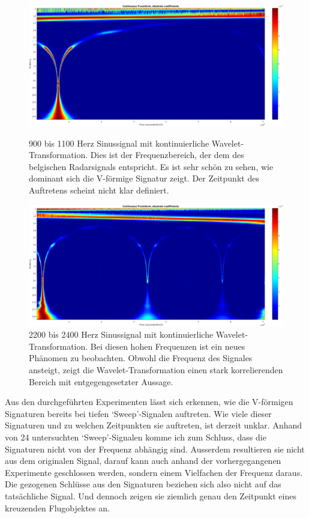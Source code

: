 \begin{refsection}
\begin{figure}
	\centering
	\includegraphics[width=1.0\linewidth]{papers/meteor/images/anomalie/sweep/cwt_0900to1100hz-clipped.png}
	\caption{900 bis 1100 Herz Sinussignal mit kontinuierliche Wavelet-Transformation.
	Dies ist der Frequenzbereich, der dem des belgischen Radarsignals entspricht.
	Es ist sehr schön zu sehen, wie dominant sich die V-förmige Signatur zeigt.
	Der Zeitpunkt des Auftretens scheint nicht klar definiert.}
	\includegraphics[width=1.0\linewidth]{papers/meteor/images/anomalie/sweep/cwt_2200to2400hz-clipped.png}
	\caption{2200 bis 2400 Herz Sinussignal mit kontinuierliche Wavelet-Transformation.
	Bei diesen hohen Frequenzen ist ein neues Phänomen zu beobachten.
	Obwohl die Frequenz des Signales ansteigt, zeigt die Wavelet-Transformation einen stark korrelierenden Bereich mit entgegengesetzter Aussage.}
	\label{fig:cwt_anomalie_beam_2}
\end{figure}
Aus den durchgeführten Experimenten lässt sich erkennen, wie die V-förmigen Signaturen bereits bei tiefen `Sweep'-Signalen auftreten.
Wie viele dieser Signaturen und zu welchen Zeitpunkten sie auftreten, ist derzeit unklar.
Anhand von 24 untersuchten `Sweep'-Signalen komme ich zum Schluss, dass die Signaturen nicht von der Frequenz abhängig sind.
Ausserdem resultieren sie nicht aus dem originalen Signal, darauf kann auch anhand der vorhergegangenen Experimente geschlossen werden, sondern einem Vielfachen der Frequenz daraus. 
Die gezogenen Schlüsse aus den Signaturen beziehen sich also nicht auf das tatsächliche Signal.
Und dennoch zeigen sie ziemlich genau den Zeitpunkt eines kreuzenden Flugobjektes an.


\end{refsection}
